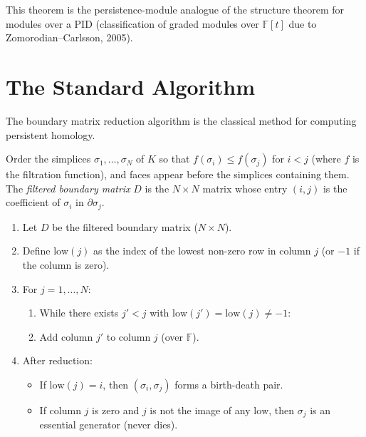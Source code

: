 \begin{remark}
This theorem is the persistence-module analogue of the structure theorem
for modules over a PID (classification of graded modules over
$\mathbb{F}[t]$ due to Zomorodian--Carlsson, 2005).
\end{remark}

\section{The Standard Algorithm}

The boundary matrix reduction algorithm is the classical method for
computing persistent homology.

\begin{definition}
Order the simplices $\sigma_1, \ldots, \sigma_N$ of $K$ so that
$f(\sigma_i) \leq f(\sigma_j)$ for $i < j$ (where $f$ is the
filtration function), and faces appear before the simplices containing
them. The \emph{filtered boundary matrix} $D$ is the $N \times N$
matrix whose entry $(i, j)$ is the coefficient of $\sigma_i$ in
$\partial \sigma_j$.
\end{definition}

\begin{algorithme}[title=\textbf{Boundary Matrix Reduction}]
\begin{enumerate}
  \item Let $D$ be the filtered boundary matrix ($N \times N$).
  \item Define $\mathrm{low}(j)$ as the index of the lowest non-zero
        row in column $j$ (or $-1$ if the column is zero).
  \item For $j = 1, \ldots, N$:
    \begin{enumerate}
      \item While there exists $j' < j$ with
            $\mathrm{low}(j') = \mathrm{low}(j) \neq -1$:
      \item Add column $j'$ to column $j$ (over $\mathbb{F}$).
    \end{enumerate}
  \item After reduction:
    \begin{itemize}
      \item If $\mathrm{low}(j) = i$, then $(\sigma_i, \sigma_j)$
            forms a birth-death pair.
      \item If column $j$ is zero and $j$ is not the image of any
            $\mathrm{low}$, then $\sigma_j$ is an essential generator
            (never dies).
    \end{itemize}
\end{enumerate}
\end{algorithme}

